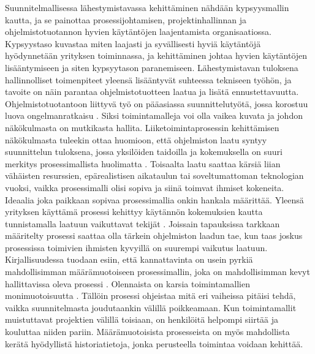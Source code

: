 \documentclass[finnish,12pt,a4paper,pdftex]{article}
\begin{document}
Suunnitelmallisessa lähestymistavassa kehittäminen nähdään kypsyysmallin kautta, ja se painottaa prosessijohtamisen, projektinhallinnan ja ohjelmistotuotannon hyvien käytäntöjen laajentamista organisaatiossa. Kypsyystaso kuvastaa miten laajasti ja syvällisesti hyviä käytäntöjä hyödynnetään yrityksen toiminnassa, ja kehittäminen johtaa hyvien käytäntöjen lisääntymiseen ja siten kypsyytason paranemiseen. Lähestymistavan tuloksena hallinnolliset toimenpiteet yleensä lisääntyvät suhteessa tekniseen työhön, ja tavoite on näin parantaa ohjelmistotuotteen laatua ja lisätä ennustettavuutta. \citep{sommerville}\\

Ohjelmistotuotantoon liittyvä työ on pääasiassa suunnittelutyötä, jossa korostuu luova ongelmanratkaisu \citep{kallio}. Siksi toimintamalleja voi olla vaikea kuvata ja johdon näkökulmasta on mutkikasta hallita. Liiketoimintaprosessin kehittämisen näkökulmasta tuleekin ottaa huomioon, että ohjelmiston laatu syntyy suunnittelun tuloksena, jossa yksilöiden taidoilla ja kokemuksella on suuri merkitys prosessimallista huolimatta \citep{ohjelmistotuotanto}. Toisaalta laatu saattaa kärsiä liian vähäisten resurssien, epärealistisen aikataulun tai soveltumattoman teknologian vuoksi, vaikka prosessimalli olisi sopiva ja siinä toimvat ihmiset kokeneita.\\

Ideaalia joka paikkaan sopivaa prosessimallia onkin hankala määrittää. Yleensä yrityksen käyttämä prosessi kehittyy käytännön kokemuksien kautta tunnistamalla laatuun vaikuttavat tekijät \citep{okaytannot, sommerville}. Joissain tapauksissa tarkkaan määritelty prosessi saattaa olla tärkein ohjelmiston laadun tae, kun taas joskus prosessissa toimivien ihmisten kyvyillä on suurempi vaikutus laatuun. \\

Kirjallisuudessa tuodaan esiin, että kannattavinta on usein pyrkiä mahdollisimman määrämuotoiseen prosessimallin, joka on mahdollisimman kevyt hallittavissa oleva prosessi \citep{okaytannot}. Olennaista on karsia toimintamallien monimuotoisuutta \citep{ohjelmistotuotanto, sommerville}. Tällöin prosessi ohjeistaa mitä eri vaiheissa pitäisi tehdä, vaikka suunnitelmasta joudutaankin välillä poikkeamaan. Kun toimintamallit muistuttavat projektien välillä toisiaan, on henkilöitä helpompi siirtää ja kouluttaa niiden pariin. Määrämuotoisista prosesseista on myös mahdollista kerätä hyödyllistä historiatietoja, jonka perusteella toimintaa voidaan kehittää.\\
\end{document}
